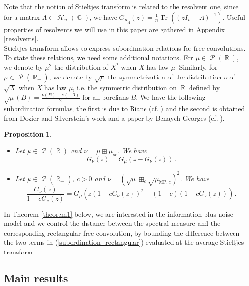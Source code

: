 \documentclass[11pt,a4paper]{article}
\DeclareMathOperator{\R}{\mathbb{R}}
\DeclareMathOperator{\C}{\mathbb{C}}
\DeclareMathOperator{\HH}{\mathcal{H}}
\DeclareMathOperator{\PP}{\mathcal{P}}
\DeclareMathOperator{\1}{\mathbf{1}}
\DeclareMathOperator{\Tr}{\mathrm{Tr}}
\newcommand{\mump}{\mu_{\mathrm{MP},c}}
\newtheorem{Proposition}{Proposition}[section]
\theoremstyle{definition}
\begin{document}
Note that the notion of Stieltjes transform is related to the resolvent one, since for a matrix $A \in \HH_n(\C)$, we have $G_{\mu_A}(z) = \frac1n \Tr((zI_n-A)^{-1})$. Useful properties of resolvents we will use in this paper are gathered in Appendix \ref{resolvents}.\\

Stieltjes transform allows to express subordination relations for free convolutions. To state these relations, we need some additional notations. For $\mu \in \PP(\R)$, we denote by $\mu^2$ the distribution of $X^2$ when $X$ has law $\mu$. Similarly, for $\mu \in \PP(\R_+)$, we denote by $\sqrt{\mu}$ the symmetrization of the distribution $\nu$ of $\sqrt{X}$ when $X$ has law $\mu$, i.e. the symmetric distribution on $\R$ defined by $\sqrt{\mu}(B) = \frac{\nu(B)+\nu(-B)}{2}$ for all borelians $B$. We have the following subordination formulas, the first is due to Biane (cf. \cite{Biane}) and the second is obtained from Dozier and Silverstein's work \cite{DS} and a paper by Benaych-Georges (cf. \cite{BG}).

\begin{Proposition}
\begin{itemize}
\item Let $\mu \in \PP(\R)$ and $\nu = \mu \boxplus \mu_{sc}$. We have
\begin{equation} \label{subordination_square}
G_{\nu}(z) = G_{\mu} \left( z-G_{\nu}(z) \right) \, .
\end{equation}
\item Let $\mu \in \PP(\R_+)$, $c>0$ and $\nu = \left( \sqrt{\mu} \boxplus_c \sqrt{\mump} \right)^2$.
We have
\begin{equation} \label{subordination_rectangular}
\frac{G_{\nu}(z)}{1-cG_{\nu}(z)} = G_{\mu} \left( z(1-cG_{\nu}(z))^2 - (1-c)(1-cG_{\nu}(z)) \right) \, .
\end{equation}
\end{itemize}
\end{Proposition}

In Theorem \ref{theorem1} below, we are interested in the information-plus-noise model and we control the distance between the spectral measure and the corresponding rectangular free convolution, by bounding the difference between the two terms in (\ref{subordination_rectangular}) evaluated at the average Stieltjes transform.




\subsection{Main results}
\end{document}
